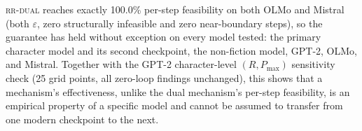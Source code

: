 \textsc{rr-dual} reaches exactly 100.0\% per-step feasibility on both OLMo and Mistral (both $\varepsilon$, zero structurally infeasible and zero near-boundary steps), so the guarantee has held without exception on every model tested: the primary character model and its second checkpoint, the non-fiction model, GPT-2, OLMo, and Mistral. Together with the GPT-2 character-level $(R,P_{\max})$ sensitivity check (25 grid points, all zero-loop findings unchanged), this shows that a mechanism's effectiveness, unlike the dual mechanism's per-step feasibility, is an empirical property of a specific model and cannot be assumed to transfer from one modern checkpoint to the next.


